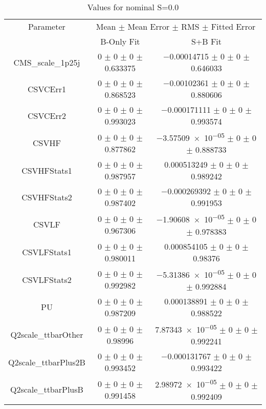 \begin{table}
\centering
\caption{Values for nominal S=0.0}
\begin{tabular}{ccc}
\toprule
Parameter & \multicolumn{2}{c}{Mean $\pm$ Mean Error $\pm$ RMS $\pm$ Fitted Error}\\
 & B-Only Fit & S+B Fit\\
\midrule
CMS\_scale\_1p25j & \num{0} $\pm$ \num{0} $\pm$ \num{0} $\pm$ \num{0.633375} & \num{-0.00014715} $\pm$ \num{0} $\pm$ \num{0} $\pm$ \num{0.646033}\\
CSVCErr1 & \num{0} $\pm$ \num{0} $\pm$ \num{0} $\pm$ \num{0.868523} & \num{-0.00102361} $\pm$ \num{0} $\pm$ \num{0} $\pm$ \num{0.880606}\\
CSVCErr2 & \num{0} $\pm$ \num{0} $\pm$ \num{0} $\pm$ \num{0.993023} & \num{-0.000171111} $\pm$ \num{0} $\pm$ \num{0} $\pm$ \num{0.993574}\\
CSVHF & \num{0} $\pm$ \num{0} $\pm$ \num{0} $\pm$ \num{0.877862} & \num{-3.57509e-05} $\pm$ \num{0} $\pm$ \num{0} $\pm$ \num{0.888733}\\
CSVHFStats1 & \num{0} $\pm$ \num{0} $\pm$ \num{0} $\pm$ \num{0.987957} & \num{0.000513249} $\pm$ \num{0} $\pm$ \num{0} $\pm$ \num{0.989242}\\
CSVHFStats2 & \num{0} $\pm$ \num{0} $\pm$ \num{0} $\pm$ \num{0.987402} & \num{-0.000269392} $\pm$ \num{0} $\pm$ \num{0} $\pm$ \num{0.991953}\\
CSVLF & \num{0} $\pm$ \num{0} $\pm$ \num{0} $\pm$ \num{0.967306} & \num{-1.90608e-05} $\pm$ \num{0} $\pm$ \num{0} $\pm$ \num{0.978383}\\
CSVLFStats1 & \num{0} $\pm$ \num{0} $\pm$ \num{0} $\pm$ \num{0.980011} & \num{0.000854105} $\pm$ \num{0} $\pm$ \num{0} $\pm$ \num{0.98376}\\
CSVLFStats2 & \num{0} $\pm$ \num{0} $\pm$ \num{0} $\pm$ \num{0.992982} & \num{-5.31386e-05} $\pm$ \num{0} $\pm$ \num{0} $\pm$ \num{0.992884}\\
PU & \num{0} $\pm$ \num{0} $\pm$ \num{0} $\pm$ \num{0.987209} & \num{0.000138891} $\pm$ \num{0} $\pm$ \num{0} $\pm$ \num{0.988522}\\
Q2scale\_ttbarOther & \num{0} $\pm$ \num{0} $\pm$ \num{0} $\pm$ \num{0.98996} & \num{7.87343e-05} $\pm$ \num{0} $\pm$ \num{0} $\pm$ \num{0.992241}\\
Q2scale\_ttbarPlus2B & \num{0} $\pm$ \num{0} $\pm$ \num{0} $\pm$ \num{0.993452} & \num{-0.000131767} $\pm$ \num{0} $\pm$ \num{0} $\pm$ \num{0.993422}\\
Q2scale\_ttbarPlusB & \num{0} $\pm$ \num{0} $\pm$ \num{0} $\pm$ \num{0.991458} & \num{2.98972e-05} $\pm$ \num{0} $\pm$ \num{0} $\pm$ \num{0.992409}\\

\end{tabular}
\end{table}
